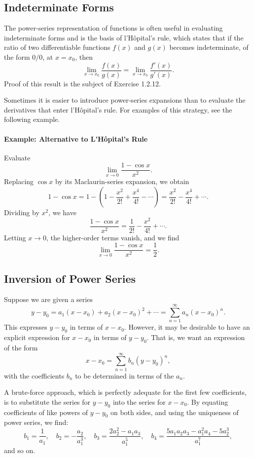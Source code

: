 \documentclass[12pt]{article}
\begin{document}
\subsection{Indeterminate Forms}
The power-series representation of functions is often useful in evaluating indeterminate forms and is the basis of l’Hôpital’s rule, which states that if the ratio of two differentiable functions \(f(x)\) and \(g(x)\) becomes indeterminate, of the form \(0/0\), at \(x = x_0\), then
\[
\lim_{x \to x_0} \frac{f(x)}{g(x)} = \lim_{x \to x_0} \frac{f'(x)}{g'(x)}.
\]
Proof of this result is the subject of Exercise 1.2.12.

Sometimes it is easier to introduce power-series expansions than to evaluate the derivatives that enter l’Hôpital’s rule. For examples of this strategy, see the following example.

\paragraph{Example: Alternative to L’Hôpital’s Rule}
Evaluate
\[
\lim_{x \to 0} \frac{1 - \cos x}{x^2}.
\]
Replacing \(\cos x\) by its Maclaurin-series expansion, we obtain
\[
1 - \cos x = 1 - \left(1 - \frac{x^2}{2!} + \frac{x^4}{4!} - \cdots\right) = \frac{x^2}{2!} - \frac{x^4}{4!} + \cdots.
\]
Dividing by \(x^2\), we have
\[
\frac{1 - \cos x}{x^2} = \frac{1}{2!} - \frac{x^2}{4!} + \cdots.
\]
Letting \(x \to 0\), the higher-order terms vanish, and we find
\[
\lim_{x \to 0} \frac{1 - \cos x}{x^2} = \frac{1}{2}.
\]

\subsection{Inversion of Power Series}
Suppose we are given a series
\[
y - y_0 = a_1 (x - x_0) + a_2 (x - x_0)^2 + \cdots = \sum_{n=1}^\infty a_n (x - x_0)^n.
\]
This expresses \(y - y_0\) in terms of \(x - x_0\). However, it may be desirable to have an explicit expression for \(x - x_0\) in terms of \(y - y_0\). That is, we want an expression of the form
\[
x - x_0 = \sum_{n=1}^\infty b_n (y - y_0)^n,
\]
with the coefficients \(b_n\) to be determined in terms of the \(a_n\).

A brute-force approach, which is perfectly adequate for the first few coefficients, is to substitute the series for \(y - y_0\) into the series for \(x - x_0\). By equating coefficients of like powers of \(y - y_0\) on both sides, and using the uniqueness of power series, we find:
\[
b_1 = \frac{1}{a_1}, \quad b_2 = -\frac{a_2}{a_1^3}, \quad b_3 = \frac{2a_2^2 - a_1 a_3}{a_1^5}, \quad b_4 = \frac{5a_1 a_2 a_3 - a_1^2 a_4 - 5a_2^3}{a_1^7},
\]
and so on.
\end{document}

